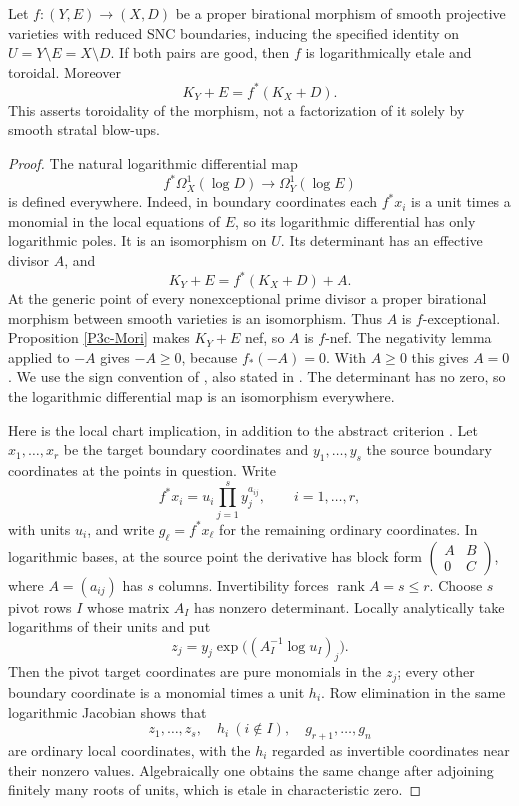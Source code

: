 \begin{theorem}\label{P3c-morphism}
Let $f:(Y,E)\to(X,D)$ be a proper birational morphism of smooth
projective varieties with reduced SNC boundaries, inducing the
specified identity on $U=Y\setminus E=X\setminus D$. If both pairs
are good, then $f$ is logarithmically etale and toroidal. Moreover
\[
 K_Y+E=f^*(K_X+D).
\]
This asserts toroidality of the morphism, not a factorization of
it solely by smooth stratal blow-ups.
\end{theorem}
\begin{proof}
The natural logarithmic differential map
\[
 f^*\Omega_X^1(\log D)\longrightarrow\Omega_Y^1(\log E)
\]
is defined everywhere. Indeed, in boundary coordinates each
$f^*x_i$ is a unit times a monomial in the local equations of
$E$, so its logarithmic differential has only logarithmic poles.
It is an isomorphism on $U$. Its determinant has an effective
divisor $A$, and
\[
 K_Y+E=f^*(K_X+D)+A.
\]
At the generic point of every nonexceptional prime divisor a
proper birational morphism between smooth varieties is an
isomorphism. Thus $A$ is $f$-exceptional. Proposition
\ref{P3c-Mori} makes $K_Y+E$ nef, so $A$ is $f$-nef. The
negativity lemma applied to $-A$ gives $-A\geq0$, because
$f_*(-A)=0$. With $A\geq0$ this gives $A=0$. We use the sign
convention of \citet[Lemma~3.39]{KollarMori1998}, also stated
in \citet[Lemma~1.73, author version p.~51]{Xu2025}.
The determinant has no zero, so the logarithmic differential
map is an isomorphism everywhere.

Here is the local chart implication, in addition to the abstract
criterion \citep[Proposition~3.12 and Theorem~3.5]{Kato1989}.
Let $x_1,\ldots,x_r$ be the target boundary coordinates and
$y_1,\ldots,y_s$ the source boundary coordinates at the points
in question. Write
\[
 f^*x_i=u_i\prod_{j=1}^s y_j^{a_{ij}},
 \qquad i=1,\ldots,r,
\]
with units $u_i$, and write $g_\ell=f^*x_\ell$ for the remaining
ordinary coordinates. In logarithmic bases, at the source
point the derivative has block form
$\left(\begin{smallmatrix}A&B\\0&C\end{smallmatrix}\right)$,
where $A=(a_{ij})$ has $s$ columns. Invertibility forces
$\operatorname{rank}A=s\leq r$. Choose $s$ pivot rows $I$
whose matrix $A_I$ has nonzero determinant. Locally analytically
take logarithms of their units and put
\[
 z_j=y_j\exp\bigl((A_I^{-1}\log u_I)_j\bigr).
\]
Then the pivot target coordinates are pure monomials in the
$z_j$; every other boundary coordinate is a monomial times a
unit $h_i$. Row elimination in the same logarithmic Jacobian
shows that
\[
 z_1,\ldots,z_s,\quad h_i\ (i\notin I),\quad
 g_{r+1},\ldots,g_n
\]
are ordinary local coordinates, with the $h_i$ regarded as
invertible coordinates near their nonzero values. Algebraically
one obtains the same change after adjoining finitely many
roots of units, which is etale in characteristic zero.


\end{proof}
